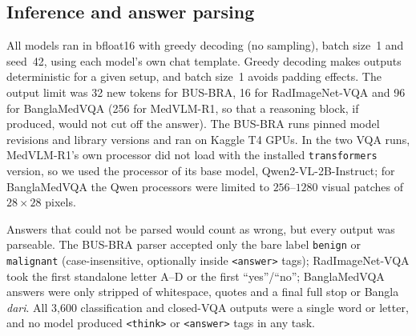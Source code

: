 \documentclass[doublecolumn]{ijcvsplatex}
\newcommand{\qwen}{Qwen2-VL}
\newcommand{\medvlm}{MedVLM-R1}
\begin{document}
\subsection{Inference and answer parsing}
\label{sec_inference}
All models ran in bfloat16 with greedy decoding (no sampling), batch size~1 and seed~42, using each model's own chat template. Greedy decoding makes outputs deterministic for a given setup, and batch size~1 avoids padding effects. The output limit was 32 new tokens for BUS-BRA, 16 for RadImageNet-VQA and 96 for BanglaMedVQA (256 for \medvlm{}, so that a reasoning block, if produced, would not cut off the answer). The BUS-BRA runs pinned model revisions and library versions and ran on Kaggle T4 GPUs. In the two VQA runs, \medvlm{}'s own processor did not load with the installed \texttt{transformers} version, so we used the processor of its base model, \qwen{}-2B-Instruct; for BanglaMedVQA the Qwen processors were limited to $256$--$1280$ visual patches of $28\times28$ pixels.

Answers that could not be parsed would count as wrong, but every output was parseable. The BUS-BRA parser accepted only the bare label \texttt{benign} or \texttt{malignant} (case-insensitive, optionally inside \texttt{<answer>} tags); RadImageNet-VQA took the first standalone letter A--D or the first ``yes''/``no''; BanglaMedVQA answers were only stripped of whitespace, quotes and a final full stop or Bangla \emph{dari}. All 3,600 classification and closed-VQA outputs were a single word or letter, and no model produced \texttt{<think>} or \texttt{<answer>} tags in any task.

\end{document}
